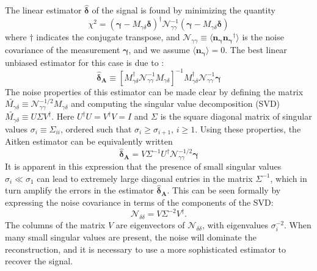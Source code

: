 \documentclass[twocolumn]{emulateapj}
\newcommand{\myvec}[1]{\boldsymbol{#1}}
\newcommand{\mymat}[1]{#1}
\begin{document}
The linear estimator $\myvec{\hat{\delta}}$ of the signal is found by 
minimizing the quantity
\begin{equation}
  \chi^2 = (\myvec\gamma-\mymat{M_{\gamma\delta}}\myvec{\delta})^\dagger 
  \mymat{\mathcal{N}_{\gamma\gamma}}^{-1} (\myvec\gamma-\mymat{M_{\gamma\delta}}\myvec{\delta})
\end{equation}
where $\dagger$ indicates the conjugate transpose, and 
$\mymat{\mathcal{N}_{\gamma\gamma}} \equiv 
\langle \myvec{n_\gamma}\myvec{n_\gamma}^\dagger\rangle$
is the noise covariance of the measurement $\myvec{\gamma}$,
and we assume $\langle \myvec{n_\gamma}\rangle = 0$.  The best linear
unbiased estimator for this case is due to \citet{Aitken34}: 
\begin{equation}
  \label{Aitken_estimator}
  \myvec{\hat{\delta}_A} \equiv
  \left[\mymat{M_{\gamma\delta}}^\dagger
    \mymat{\mathcal{N}_{\gamma\gamma}}^{-1}\mymat{M_{\gamma\delta}}\right]^{-1}
  \mymat{M_{\gamma\delta}}^\dagger
  \mymat{\mathcal{N}_{\gamma\gamma}}^{-1}\myvec{\gamma}
\end{equation}
The noise properties of this estimator can be made clear by
defining the matrix
$\mymat{\widetilde{M_{\gamma\delta}}}\equiv 
\mymat{\mathcal{N}_{\gamma\gamma}}^{-1/2}\mymat{M_{\gamma\delta}}$ and
computing the singular value decomposition (SVD)
$\mymat{\widetilde{M_{\gamma\delta}}} 
\equiv \mymat{U}\mymat{\Sigma}\mymat{V}^\dagger$.
Here $\mymat{U}^\dagger \mymat{U} = \mymat{V}^\dagger \mymat{V} = \mymat{I}$ 
and $\Sigma$ is the square diagonal matrix of singular values 
$\sigma_i\equiv\Sigma_{ii}$, ordered such that $\sigma_i\ge\sigma_{i+1}$, 
$i\ge 1$.  Using these properties, the Aitken estimator can be equivalently 
written
\begin{equation}
  \label{Aitken_SVD}
  \myvec{\hat{\delta}_A} = \mymat{V} \mymat{\Sigma}^{-1} 
  \mymat{U}^\dagger \mymat{\mathcal{N}_{\gamma\gamma}}^{-1/2} \myvec{\gamma}
\end{equation}
It is apparent in this expression that the presence of small singular values 
$\sigma_i \ll \sigma_1$ can lead to extremely large diagonal entries 
in the matrix $\mymat{\Sigma^{-1}}$, which in turn amplify the errors in the
estimator $\myvec{\hat{\delta}_A}$. 
This can be seen formally by expressing the noise covariance
in terms of the components of the SVD:
\begin{equation}
  \label{Ndd_decomp}
  \mymat{\mathcal{N}_{\delta\delta}} = 
  \mymat{V}\mymat{\Sigma}^{-2}\mymat{V}^\dagger.
\end{equation}
The columns of the matrix $\mymat{V}$ are eigenvectors of
$\mymat{\mathcal{N}_{\delta\delta}}$, with eigenvalues $\sigma_i^{-2}$.
When many small singular values are present, the noise will dominate
the reconstruction, and it is necessary to 
use a more sophisticated estimator to recover the signal.
\end{document}
